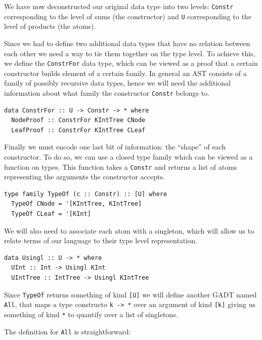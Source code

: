 \documentclass[11pt, titlepage]{article}
\newcommand{\toHaskell}[1]{\texttt{#1}\xspace}
\begin{document}
We have now deconstructed our original data type into two levels: \texttt{Constr} corresponding to the level of sums (the constructor) 
and  \texttt{U} corresponding to the level of products (the atoms).

Since we had to define two additional data types that have no relation between 
each other we need a way to tie them together on the type level.
To achieve this, we define the \texttt{ConstrFor} data type,
which can be viewed as a proof that a certain constructor builds element
of a certain family. In general an AST consists of a family of possibly 
recursive data types, hence we will need the additional information about what 
family the constructor \texttt{Constr} belongs to.

\begin{verbatim}
data ConstrFor :: U -> Constr -> * where
  NodeProof :: ConstrFor KIntTree CNode
  LeafProof :: ConstrFor KIntTree CLeaf
\end{verbatim}

Finally we must encode one last bit of information: the ``shape'' of
each constructor. To do so, we can use a closed type family which can be
viewed as a function on types. This function takes a \texttt{Constr} and
returns a list of atoms representing the arguments the constructor
accepts.

\begin{verbatim}
type family TypeOf (c :: Constr) :: [U] where
  TypeOf CNode = '[KIntTree, KIntTree]
  TypeOf CLeaf = '[KInt]
\end{verbatim}

We will also need to associate each atom with a singleton, which will
allow us to relate terms of our language to their type level representation. 

\begin{verbatim}
data Usingl :: U -> * where
  UInt :: Int -> Usingl KInt
  UIntTree :: IntTree -> Usingl KIntTree
\end{verbatim}

Since \toHaskell{TypeOf} returns something of kind \toHaskell{[U]} we will define another GADT named \toHaskell{All}, that maps a type constructo \toHaskell{k -> *} over an argument of kind \texttt{[k]} giving us something of kind \texttt{*} to quantify over a list of singletons.

The definition for \texttt{All} is straightforward:
\end{document}
